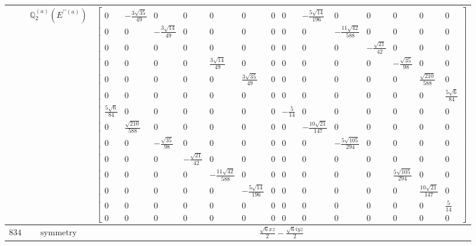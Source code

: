\documentclass[fleqn,8pt,landscape]{jsarticle}
\begin{document}
\begin{longtable}{ccc}
$  $ & $ \mathbb{Q}_{2}^{(a)}(E^{\prime\prime(a)}) $ & $ \begin{bmatrix} 0 & - \frac{3 \sqrt{35}}{49} & 0 & 0 & 0 & 0 & 0 & 0 & - \frac{5 \sqrt{14}}{196} & 0 & 0 & 0 & 0 & 0 \\ 0 & 0 & - \frac{3 \sqrt{14}}{49} & 0 & 0 & 0 & 0 & 0 & 0 & - \frac{11 \sqrt{42}}{588} & 0 & 0 & 0 & 0 \\ 0 & 0 & 0 & 0 & 0 & 0 & 0 & 0 & 0 & 0 & - \frac{\sqrt{21}}{42} & 0 & 0 & 0 \\ 0 & 0 & 0 & 0 & \frac{3 \sqrt{14}}{49} & 0 & 0 & 0 & 0 & 0 & 0 & - \frac{\sqrt{35}}{98} & 0 & 0 \\ 0 & 0 & 0 & 0 & 0 & \frac{3 \sqrt{35}}{49} & 0 & 0 & 0 & 0 & 0 & 0 & \frac{\sqrt{210}}{588} & 0 \\ 0 & 0 & 0 & 0 & 0 & 0 & 0 & 0 & 0 & 0 & 0 & 0 & 0 & \frac{5 \sqrt{6}}{84} \\ \frac{5 \sqrt{6}}{84} & 0 & 0 & 0 & 0 & 0 & 0 & - \frac{5}{14} & 0 & 0 & 0 & 0 & 0 & 0 \\ 0 & \frac{\sqrt{210}}{588} & 0 & 0 & 0 & 0 & 0 & 0 & - \frac{10 \sqrt{21}}{147} & 0 & 0 & 0 & 0 & 0 \\ 0 & 0 & - \frac{\sqrt{35}}{98} & 0 & 0 & 0 & 0 & 0 & 0 & - \frac{5 \sqrt{105}}{294} & 0 & 0 & 0 & 0 \\ 0 & 0 & 0 & - \frac{\sqrt{21}}{42} & 0 & 0 & 0 & 0 & 0 & 0 & 0 & 0 & 0 & 0 \\ 0 & 0 & 0 & 0 & - \frac{11 \sqrt{42}}{588} & 0 & 0 & 0 & 0 & 0 & 0 & \frac{5 \sqrt{105}}{294} & 0 & 0 \\ 0 & 0 & 0 & 0 & 0 & - \frac{5 \sqrt{14}}{196} & 0 & 0 & 0 & 0 & 0 & 0 & \frac{10 \sqrt{21}}{147} & 0 \\ 0 & 0 & 0 & 0 & 0 & 0 & 0 & 0 & 0 & 0 & 0 & 0 & 0 & \frac{5}{14} \\ 0 & 0 & 0 & 0 & 0 & 0 & 0 & 0 & 0 & 0 & 0 & 0 & 0 & 0 \end{bmatrix} $ \\ \hline
$ 834 $ & $ \text{symmetry} $ & $ \frac{\sqrt{6} x z}{2} - \frac{\sqrt{6} i y z}{2} $ \\

\end{longtable}
\end{document}
